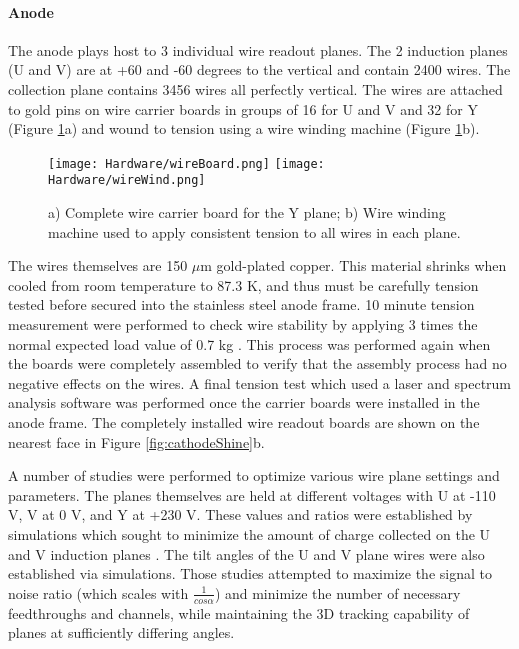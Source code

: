 \paragraph{Anode}
\par The anode plays host to 3 individual wire readout planes. The 2 induction planes (U and V) are at +60 and -60 degrees to the vertical and contain 2400 wires. The collection plane contains 3456 wires all perfectly vertical. The wires are attached to gold pins on wire carrier boards in groups of 16 for U and V and 32 for Y (Figure \ref{fig:wire_stuff}a) and wound to tension using a wire winding machine (Figure \ref{fig:wire_stuff}b). 

\begin{figure}[h!]
\centering
\texttt{[image: Hardware/wireBoard.png]}
\hspace{3 mm} 
\texttt{[image: Hardware/wireWind.png]}
\caption{ a) Complete wire carrier board for the Y plane; b) Wire winding machine used to apply consistent tension to all wires in each plane. }
\label{fig:wire_stuff}
\end{figure}

\par The wires themselves are 150 $\mu$m gold-plated copper.  This material shrinks when cooled from room temperature to 87.3 K, and thus must be carefully tension tested before secured into the stainless steel anode frame. 10 minute tension measurement were performed to check wire stability by applying 3 times the normal expected load value of 0.7 kg \cite{bib:uboone_JINST}.  This process was performed again when the boards were completely assembled to verify that the assembly process had no negative effects on the wires. A final tension test which used a laser and spectrum analysis software was performed once the carrier boards were installed in the anode frame. The completely installed wire readout boards are shown on the nearest face in Figure \ref{fig:cathodeShine}b.

\par A number of studies were performed to optimize various wire plane settings and parameters. The planes themselves are held at different voltages with U at -110 V, V at 0 V, and Y at +230 V.  These values and ratios were established by simulations which sought to minimize the amount of charge collected on the U and V induction planes \cite{bib:tdr}.  The tilt angles of the U and V plane wires were also established via simulations.  Those studies attempted to maximize the signal to noise ratio (which scales with $\frac{1}{cos\alpha}$) and minimize the number of necessary feedthroughs and channels, while maintaining the 3D tracking capability of planes at sufficiently differing angles.

